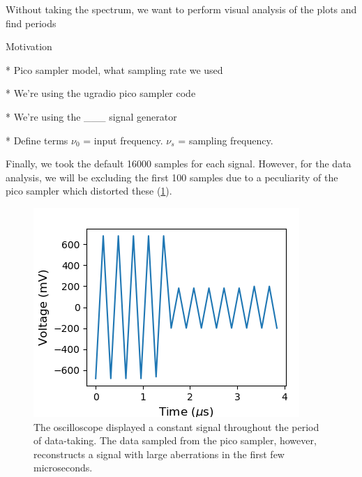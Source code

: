 \documentclass[a4paper]{article}
\begin{document}
Without taking the spectrum, we want to perform visual analysis of the plots and find periods

Motivation

* Pico sampler model, what sampling rate we used

* We're using the ugradio pico sampler code

* We're using the \_\_\_ signal generator

* Define terms $\nu_0$ = input frequency. $\nu_s$ = sampling frequency.

Finally, we took the default 16000 samples for each signal. However, for the data analysis, we will be excluding the first 100 samples due to a peculiarity of the pico sampler which distorted these (\ref{fig:pico_start}).


\begin{figure}
\centering
\includegraphics{5-2/pico_bad} %
\caption{\label{fig:pico_start}The oscilloscope displayed a constant signal throughout the period of data-taking. The data sampled from the pico sampler, however, reconstructs a signal with large aberrations in the first few microseconds.}
\end{figure}
\end{document}
